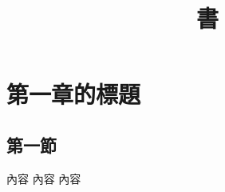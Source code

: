 \documentclass[lang=zh, twoside, header=default]{akizumi-book}
\title{書}
\begin{document}
\mainmatter
\chapter{第一章的標題}
\section{第一節}

內容 \newpage 內容 \newpage 內容
\end{document}
